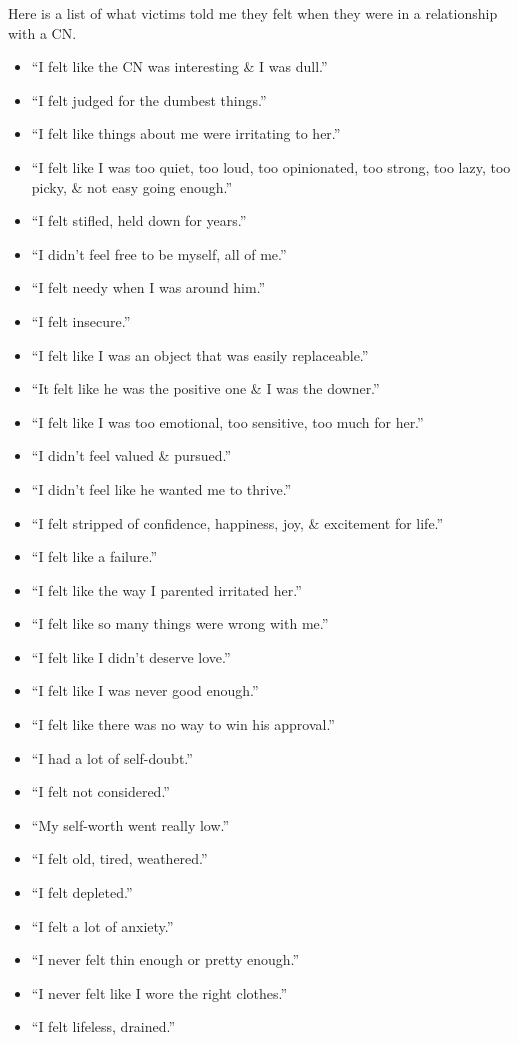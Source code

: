 \documentclass{article}
\numberwithin{equation}{section}
\begin{document}
Here is a list of what victims told me they felt when they were in a relationship with a CN.
\begin{itemize}
	\item ``I felt like the CN was interesting \& I was dull.''
	\item ``I felt judged for the dumbest things.''
	\item ``I felt like things about me were irritating to her.''
	\item ``I felt like I was too quiet, too loud, too opinionated, too strong, too lazy, too picky, \& not easy going enough.''
	\item ``I felt stifled, held down for years.''
	\item ``I didn't feel free to be myself, all of me.''
	\item ``I felt needy when I was around him.''
	\item ``I felt insecure.''
	\item ``I felt like I was an object that was easily replaceable.''
	\item ``It felt like he was the positive one \& I was the downer.''
	\item ``I felt like I was too emotional, too sensitive, too much for her.''
	\item ``I didn't feel valued \& pursued.''
	\item ``I didn't feel like he wanted me to thrive.''
	\item ``I felt stripped of confidence, happiness, joy, \& excitement for life.''
	\item ``I felt like a failure.''
	\item ``I felt like the way I parented irritated her.''
	\item ``I felt like so many things were wrong with me.''
	\item ``I felt like I didn't deserve love.''
	\item ``I felt like I was never good enough.''
	\item ``I felt like there was no way to win his approval.''
	\item ``I had a lot of self-doubt.''
	\item ``I felt not considered.''
	\item ``My self-worth went really low.''
	\item ``I felt old, tired, weathered.''
	\item ``I felt depleted.''
	\item ``I felt a lot of anxiety.''
	\item ``I never felt thin enough or pretty enough.''
	\item ``I never felt like I wore the right clothes.''
	\item ``I felt lifeless, drained.''
\end{itemize}
\end{document}
